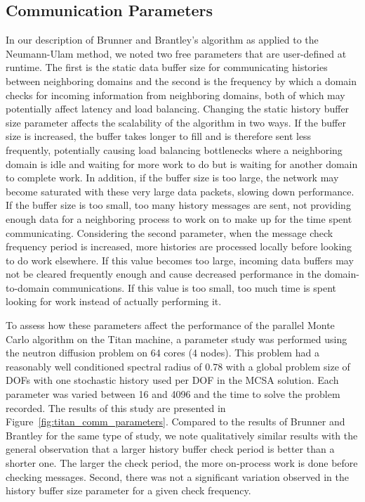 \subsection{Communication Parameters}
\label{subsec:comm_parameters}

In our description of Brunner and Brantley's algorithm as applied to
the Neumann-Ulam method, we noted two free parameters that are
user-defined at runtime. The first is the static data buffer size for
communicating histories between neighboring domains and the second is
the frequency by which a domain checks for incoming information from
neighboring domains, both of which may potentially affect latency and
load balancing. Changing the static history buffer size parameter
affects the scalability of the algorithm in two ways. If the buffer
size is increased, the buffer takes longer to fill and is therefore
sent less frequently, potentially causing load balancing bottlenecks
where a neighboring domain is idle and waiting for more work to do but
is waiting for another domain to complete work. In addition, if the
buffer size is too large, the network may become saturated with these
very large data packets, slowing down performance. If the buffer size
is too small, too many history messages are sent, not providing enough
data for a neighboring process to work on to make up for the time
spent communicating. Considering the second parameter, when the
message check frequency period is increased, more histories are
processed locally before looking to do work elsewhere. If this value
becomes too large, incoming data buffers may not be cleared frequently
enough and cause decreased performance in the domain-to-domain
communications. If this value is too small, too much time is spent
looking for work instead of actually performing it.

To assess how these parameters affect the performance of the parallel
Monte Carlo algorithm on the Titan machine, a parameter study was
performed using the neutron diffusion problem on 64 cores (4
nodes). This problem had a reasonably well conditioned spectral radius
of 0.78 with a global problem size of  DOFs with one
stochastic history used per DOF in the MCSA solution. Each parameter
was varied between 16 and 4096 and the time to solve the problem
recorded. The results of this study are presented in
Figure~\ref{fig:titan_comm_parameters}. Compared to the results of
Brunner and Brantley for the same type of study, we note qualitatively
similar results with the general observation that a larger history
buffer check period is better than a shorter one. The larger the check
period, the more on-process work is done before checking
messages. Second, there was not a significant variation observed in
the history buffer size parameter for a given check frequency.

